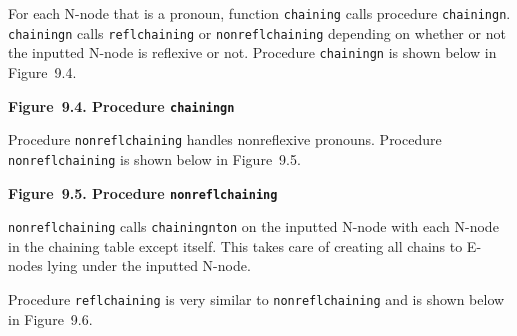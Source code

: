 \documentclass{article}
\begin{document}
For each N-node that is a pronoun, function \texttt{chaining}
calls procedure \texttt{chainingn}. \texttt{chainingn} calls
\texttt{reflchaining} or \texttt{nonreflchaining} depending on
whether or not the inputted N-node is reflexive or
not. Procedure \texttt{chainingn} is shown below in Figure~9.4.

\bigbreak
\begin{minipage}{\textwidth}
\vbox{}
\bigbreak
{}
\textbf{Figure~9.4. Procedure \texttt{chainingn}}
\end{minipage}
\bigbreak

Procedure \texttt{nonreflchaining} handles nonreflexive
pronouns. Procedure \texttt{nonreflchaining} is shown below in
Figure~9.5.

\bigbreak
\begin{minipage}{\textwidth}
\vbox{}
\bigbreak
{}
\textbf{Figure~9.5. Procedure \texttt{nonreflchaining}}
\end{minipage}
\bigbreak

\texttt{nonreflchaining} calls \texttt{chainingnton} on the
inputted N-node with each N-node in the chaining table except
itself.  This takes care of creating all chains to E-nodes lying
under the inputted N-node.

Procedure \texttt{reflchaining} is very similar to
\texttt{nonreflchaining} and is shown below in Figure~9.6.
\end{document}
